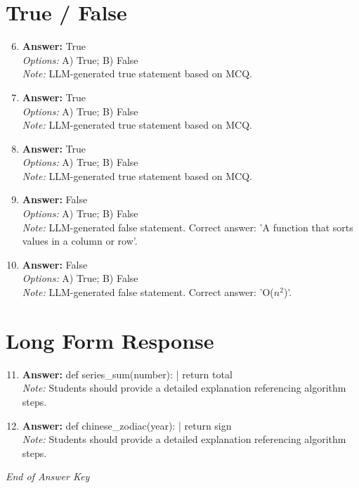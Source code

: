 \documentclass[12pt]{article}
\begin{document}
\section*{True / False}
\begin{enumerate}[label=\arabic*.]
\setcounter{enumi}{5}
\item \textbf{Answer:} True
\\ \textit{Options:} A) True; B) False
\\ \textit{Note:} LLM-generated true statement based on MCQ.
\item \textbf{Answer:} True
\\ \textit{Options:} A) True; B) False
\\ \textit{Note:} LLM-generated true statement based on MCQ.
\item \textbf{Answer:} True
\\ \textit{Options:} A) True; B) False
\\ \textit{Note:} LLM-generated true statement based on MCQ.
\item \textbf{Answer:} False
\\ \textit{Options:} A) True; B) False
\\ \textit{Note:} LLM-generated false statement. Correct answer: 'A function that sorts values in a column or row'.
\item \textbf{Answer:} False
\\ \textit{Options:} A) True; B) False
\\ \textit{Note:} LLM-generated false statement. Correct answer: 'O($n^2$)'.
\end{enumerate}

\section*{Long Form Response}
\begin{enumerate}[label=\arabic*.]
\setcounter{enumi}{10}
\item \textbf{Answer:} def series\_sum(number): | return total
\\ \textit{Note:} Students should provide a detailed explanation referencing algorithm steps.
\item \textbf{Answer:} def chinese\_zodiac(year): | return sign
\\ \textit{Note:} Students should provide a detailed explanation referencing algorithm steps.
\end{enumerate}

\vfill
\noindent\textit{End of Answer Key}
\end{document}

